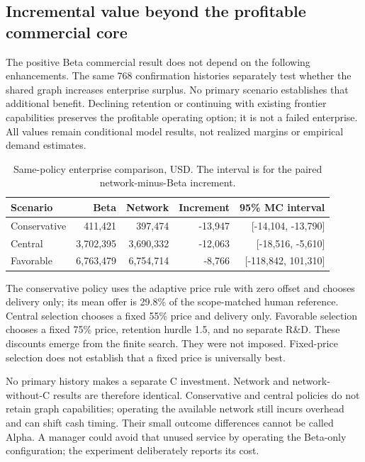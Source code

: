 \subsection{Incremental value beyond the profitable commercial core}

The positive Beta commercial result does not depend on the following enhancements. The same 768 confirmation histories separately test whether the shared graph increases enterprise surplus. No primary scenario establishes that additional benefit. Declining retention or continuing with existing frontier capabilities preserves the profitable operating option; it is not a failed enterprise. All values remain conditional model results, not realized margins or empirical demand estimates.

\begin{table}[H]\centering\small\caption{Same-policy enterprise comparison, USD. The interval is for the paired network-minus-Beta increment.}\label{tab:primary}

\begin{tabular}{lrrrr}\toprule Scenario & Beta & Network & Increment & 95\% MC interval\\\midrule

Conservative & 411,421 & 397,474 & -13,947 & [-14,104, -13,790] \\

Central & 3,702,395 & 3,690,332 & -12,063 & [-18,516, -5,610] \\

Favorable & 6,763,479 & 6,754,714 & -8,766 & [-118,842, 101,310] \\

\bottomrule\end{tabular}\end{table}

The conservative policy uses the adaptive price rule with zero offset and chooses delivery only; its mean offer is 29.8\% of the scope-matched human reference. Central selection chooses a fixed 55\% price and delivery only. Favorable selection chooses a fixed 75\% price, retention hurdle 1.5, and no separate R\&D. These discounts emerge from the finite search. They were not imposed. Fixed-price selection does not establish that a fixed price is universally best.

No primary history makes a separate C investment. Network and network-without-C results are therefore identical. Conservative and central policies do not retain graph capabilities; operating the available network still incurs overhead and can shift cash timing. Their small outcome differences cannot be called Alpha. A manager could avoid that unused service by operating the Beta-only configuration; the experiment deliberately reports its cost.

